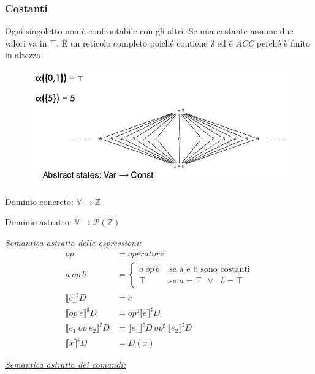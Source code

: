 \documentclass[a4paper, 11pt]{report}
\begin{document}
\subsubsection*{Costanti}
Ogni singoletto non è confrontabile con gli altri. Se una costante assume due valori va in $\top$. \MakeUppercase{è} un reticolo completo poiché contiene $\emptyset$ ed è \textit{ACC} perché è finito in altezza.
\begin{figure}[H]
	\centering
	\includegraphics[scale=0.32]{Const}
\end{figure}

Dominio concreto: $\mathbb{V}\rightarrow \mathbb{Z}$

Dominio astratto: $\mathbb{V}\rightarrow \mathcal{P}(\mathbb{Z})$
\newline

\noindent
\underline{\textit{Semantica astratta delle espressioni:}}
\begin{align*}
op &= operatore\\
a ~op~ b &=
\begin{cases}
a ~op~ b &\text{ se a e b sono costanti}\\
\top &\text{ se $a=\top$ $\lor~$ $b=\top$}
\end{cases}\\
\llbracket c \rrbracket^\sharp D &= c\\
\llbracket op~e \rrbracket^\sharp D &= op^\sharp\llbracket e\rrbracket^\sharp D\\
\llbracket e_1~op~e_2 \rrbracket^\sharp D &= \llbracket e_1\rrbracket^\sharp D ~op^\sharp~\llbracket e_2\rrbracket^\sharp D\\
\llbracket x\rrbracket^\sharp D &= D(x)
\end{align*}

\underline{\textit{Semantica astratta dei comandi:}}
\end{document}
